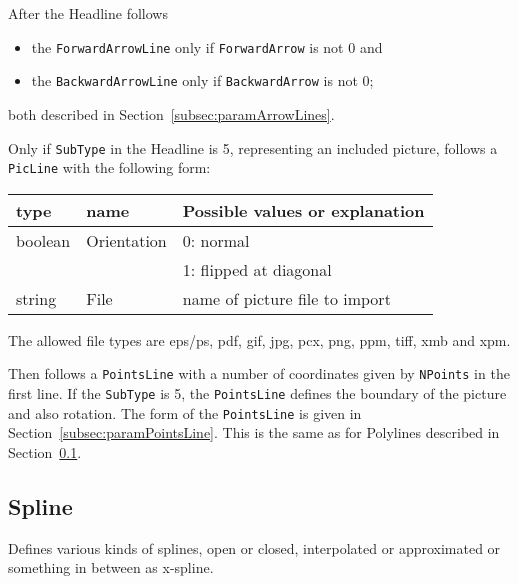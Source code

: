 \documentclass[10pt, a4paper]{article}
\begin{document}
\noindent
After the Headline follows 
%
\begin{itemize}
\item
the \texttt{ForwardArrowLine}  only if \texttt{ForwardArrow}  is not 0 and 
\item
the \texttt{BackwardArrowLine} only if \texttt{BackwardArrow} is not 0; 
\end{itemize}
%
both described in Section~\ref{subsec:paramArrowLines}. 


Only if \texttt{SubType} in the Headline is 5, representing an included picture, 
follows a \texttt{PicLine} with the following form: \\
%
\begin{tabular}{lll}
\toprule
type    & name        & Possible values or explanation \\
\midrule
\midrule
boolean & Orientation & 0: normal \\
        &             & 1: flipped at diagonal \\
string  & File        & name of picture file to import \\
\bottomrule
\end{tabular}

The allowed file types are eps/ps, pdf, gif, jpg, pcx, png, ppm, tiff, xmb and xpm. 

Then follows a \texttt{PointsLine} with a number of coordinates 
given by \texttt{NPoints} in the first line. 
If the \texttt{SubType} is 5, the \texttt{PointsLine} 
defines the boundary of the picture and also rotation. 
The form of the \texttt{PointsLine} is given 
in Section~\ref{subsec:paramPointsLine}. 
This is the same as for Polylines described in Section~\ref{subsec:spline}. 



\subsection{Spline }\label{subsec:spline}

Defines various kinds of splines, 
open or closed, interpolated or approximated or 
something in between as x-spline. 
\end{document}
